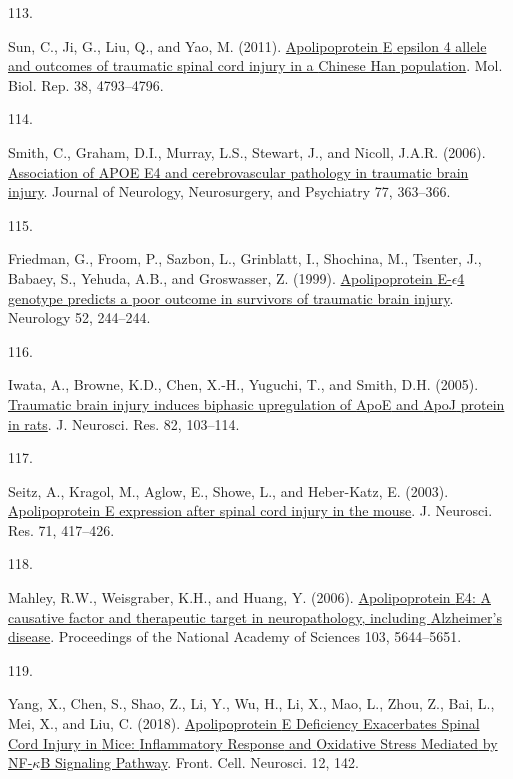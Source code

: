\documentclass[
]{article}
\newlength{\cslhangindent}
\newlength{\csllabelwidth}
\newlength{\cslentryspacingunit} %
\newenvironment{CSLReferences}[2] %
 {%
  \setlength{\parindent}{0pt}
  \ifodd #1
  \let\oldpar\par
  \def\par{\hangindent=\cslhangindent\oldpar}
  \fi
  \setlength{\parskip}{#2\cslentryspacingunit}
 }%
 {}
\newcommand{\CSLLeftMargin}[1]{\parbox[t]{\csllabelwidth}{#1}}
\newcommand{\CSLRightInline}[1]{\parbox[t]{\linewidth - \csllabelwidth}{#1}\break}
\begin{document}
\begin{CSLReferences}{0}{0}
\leavevmode{}%
\CSLLeftMargin{113. }
\CSLRightInline{Sun, C., Ji, G., Liu, Q., and Yao, M. (2011). \href{https://doi.org/10.1007/s11033-010-0620-2}{Apolipoprotein {E} epsilon 4 allele and outcomes of traumatic spinal cord injury in a {Chinese Han} population}. Mol. Biol. Rep. 38, 4793--4796.}

\leavevmode{}%
\CSLLeftMargin{114. }
\CSLRightInline{Smith, C., Graham, D.I., Murray, L.S., Stewart, J., and Nicoll, J.A.R. (2006). \href{https://doi.org/10.1136/jnnp.2005.074617}{Association of {APOE} E4 and cerebrovascular pathology in traumatic brain injury}. Journal of Neurology, Neurosurgery, and Psychiatry 77, 363--366.}

\leavevmode{}%
\CSLLeftMargin{115. }
\CSLRightInline{Friedman, G., Froom, P., Sazbon, L., Grinblatt, I., Shochina, M., Tsenter, J., Babaey, S., Yehuda, A.B., and Groswasser, Z. (1999). \href{https://doi.org/10.1212/WNL.52.2.244}{Apolipoprotein {E-\(\epsilon\)4} genotype predicts a poor outcome in survivors of traumatic brain injury}. Neurology 52, 244--244.}

\leavevmode{}%
\CSLLeftMargin{116. }
\CSLRightInline{Iwata, A., Browne, K.D., Chen, X.-H., Yuguchi, T., and Smith, D.H. (2005). \href{https://doi.org/10.1002/jnr.20607}{Traumatic brain injury induces biphasic upregulation of {ApoE} and {ApoJ} protein in rats}. J. Neurosci. Res. 82, 103--114.}

\leavevmode{}%
\CSLLeftMargin{117. }
\CSLRightInline{Seitz, A., Kragol, M., Aglow, E., Showe, L., and Heber-Katz, E. (2003). \href{https://doi.org/10.1002/jnr.10482}{Apolipoprotein {E} expression after spinal cord injury in the mouse}. J. Neurosci. Res. 71, 417--426.}

\leavevmode{}%
\CSLLeftMargin{118. }
\CSLRightInline{Mahley, R.W., Weisgraber, K.H., and Huang, Y. (2006). \href{https://doi.org/10.1073/pnas.0600549103}{Apolipoprotein {E4}: {A} causative factor and therapeutic target in neuropathology, including {Alzheimer}'s disease}. Proceedings of the National Academy of Sciences 103, 5644--5651.}

\leavevmode{}%
\CSLLeftMargin{119. }
\CSLRightInline{Yang, X., Chen, S., Shao, Z., Li, Y., Wu, H., Li, X., Mao, L., Zhou, Z., Bai, L., Mei, X., and Liu, C. (2018). \href{https://doi.org/10.3389/fncel.2018.00142}{Apolipoprotein {E Deficiency Exacerbates Spinal Cord Injury} in {Mice}: {Inflammatory Response} and {Oxidative Stress Mediated} by {NF-\(\kappa\)B Signaling Pathway}}. Front. Cell. Neurosci. 12, 142.}


\end{CSLReferences}
\end{document}
